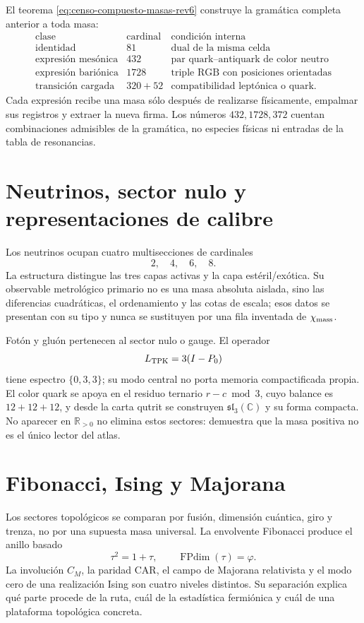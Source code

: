 El teorema \eqref{eq:censo-compuesto-masas-rev6} construye la gramática
completa anterior a toda masa:
\[
\begin{array}{c|r|l}
\text{clase}&\text{cardinal}&\text{condición interna}\\ \hline
\text{identidad}&81&\text{dual de la misma celda}\\
\text{expresión mesónica}&432&\text{par quark--antiquark de color neutro}\\
\text{expresión bariónica}&1728&\text{triple RGB con posiciones orientadas}\\
\text{transición cargada}&320+52&
\text{compatibilidad leptónica o quark}.
\end{array}
\tag{C7}\label{eq:clases-compuestas-catalogo-rev6}
\]
Cada expresión recibe una masa sólo después de realizarse físicamente,
empalmar sus registros y extraer la nueva firma. Los números
\(432,1728,372\) cuentan combinaciones admisibles de la gramática, no
especies físicas ni entradas de la tabla de resonancias.

\section{Neutrinos, sector nulo y representaciones de calibre}

Los neutrinos ocupan cuatro multisecciones de cardinales
\[
2,\quad4,\quad6,\quad8.
\]
La estructura distingue las tres capas activas y la capa
estéril/exótica. Su observable metrológico primario no es una masa absoluta
aislada, sino las diferencias cuadráticas, el ordenamiento y las cotas de
escala; esos datos se presentan con su tipo y nunca se sustituyen por una
fila inventada de \(\chi_{\rm mass}\).

Fotón y gluón pertenecen al sector nulo o gauge. El operador
\[
L_{\rm TPK}=3(I-P_0)
\]
tiene espectro \(\{0,3,3\}\); su modo central no porta memoria
compactificada propia. El color quark se apoya en el residuo ternario
\(r-c\bmod3\), cuyo balance es \(12+12+12\), y desde la carta qutrit se
construyen \(\mathfrak{sl}_3(\mathbb C)\) y su forma compacta. No aparecer
en \(\mathbb R_{>0}\) no elimina estos sectores: demuestra que la masa
positiva no es el único lector del atlas.

\section{Fibonacci, Ising y Majorana}

Los sectores topológicos se comparan por fusión, dimensión cuántica, giro y
trenza, no por una supuesta masa universal. La envolvente Fibonacci produce
el anillo basado
\[
\tau^2=1+\tau,
\qquad
\operatorname{FPdim}(\tau)=\varphi.
\tag{C8}\label{eq:fibonacci-catalogo-rev6}
\]
La involución \(C_M\), la paridad CAR, el campo de Majorana relativista y el
modo cero de una realización Ising son cuatro niveles distintos. Su
separación explica qué parte procede de la ruta, cuál de la estadística
fermiónica y cuál de una plataforma topológica concreta.

